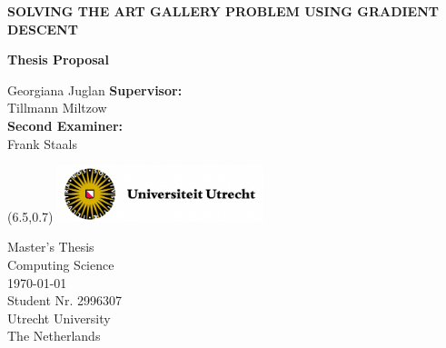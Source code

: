 \documentclass{article}
\begin{document}
\nocite{*} %

\thispagestyle{empty} 
\begin{center}
    \vspace*{0.5cm}
    \huge
    \textbf{SOLVING THE ART GALLERY PROBLEM USING GRADIENT DESCENT}

    \vspace*{0.4cm}
    \textbf{Thesis Proposal }
    \vspace*{2cm}




    \vspace{-1cm}
    \LARGE
    Georgiana Juglan
    \vfill 
    \large    
    \textbf{Supervisor:} \\
    Tillmann Miltzow \\
    \textbf{Second Examiner:} \\
    Frank Staals \\
     
\end{center}
   

\begin{textblock}{3}(6.5,0.7)
\includegraphics[width = 6cm]{Figures/UU logo.png}
\end{textblock}

\begin{flushleft}
    \vspace{0.5cm}
    Master's Thesis \\
    Computing Science\\
    \today\\
    Student Nr. 2996307 \\
    Utrecht University\\
    The Netherlands
\end{flushleft}

\newpage
\thispagestyle{empty}

\thispagestyle{empty}
\tableofcontents
\thispagestyle{empty}


% 
% 
% 
% 

\renewcommand{\headrulewidth}{0pt}%
\fancyhead{}%




%
\end{document}

